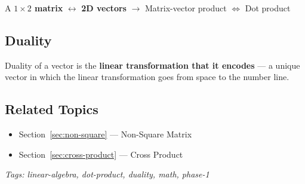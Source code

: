 A \textbf{$1\times2$ matrix} $\leftrightarrow$ \textbf{2D vectors} $\rightarrow$ Matrix-vector product $\Leftrightarrow$ Dot product

\subsection{Duality}

\begin{defbox}
Duality of a vector is the \textbf{linear transformation that it encodes} --- a unique vector in which the linear transformation goes from space to the number line.
\end{defbox}

\subsection*{Related Topics}
\begin{itemize}[nosep]
  \item Section~\ref{sec:non-square} --- Non-Square Matrix
  \item Section~\ref{sec:cross-product} --- Cross Product
\end{itemize}

\bigskip
\noindent\textit{Tags: linear-algebra, dot-product, duality, math, phase-1}
